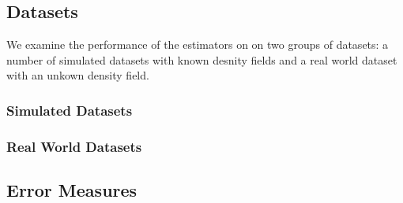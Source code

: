 

\subsection{Datasets}
\label{ss:3:datasets}
	We examine the performance of the estimators on on two groups of datasets: a number of simulated datasets with known desnity fields and a real world dataset with an unkown density field.

	\subsubsection*{Simulated Datasets}
					

	\subsubsection*{Real World Datasets}

\subsection{Error Measures}
\label{ss:3:errorMeasures}

